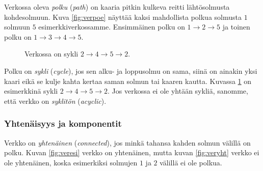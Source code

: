 
Verkossa oleva \emph{polku} (\emph{path}) on kaaria pitkin kulkeva reitti
lähtösolmusta kohdesolmuun.
Kuva \ref{fig:verpoe} näyttää kaksi
mahdollista polkua solmusta $1$ solmuun $5$ esimerkkiverkossamme.
Ensimmäinen polku on $1 \rightarrow 2 \rightarrow 5$
ja toinen polku on $1 \rightarrow 3 \rightarrow 4 \rightarrow 5$.

\begin{figure}
\center
\begin{center}
\end{center}
\caption{Verkossa on sykli $2 \rightarrow 4 \rightarrow 5 \rightarrow 2$.}
\label{fig:versyk}
\end{figure}


Polku on \emph{sykli} (\emph{cycle}), jos sen alku- ja loppusolmu on sama,
siinä on ainakin yksi kaari 
eikä se kulje kahta kertaa saman solmun tai kaaren kautta.
Kuvassa \ref{fig:versyk} on esimerkkinä sykli
$2 \rightarrow 4 \rightarrow 5 \rightarrow 2$.
Jos verkossa ei ole yhtään sykliä, sanomme, että verkko on \emph{syklitön}
(\emph{acyclic}).

\subsubsection{Yhtenäisyys ja komponentit}


Verkko on \emph{yhtenäinen} (\emph{connected}),
jos minkä tahansa kahden solmun välillä on polku.
Kuvan \ref{fig:veresi} verkko on yhtenäinen,
mutta kuvan \ref{fig:veryht} verkko ei ole yhtenäinen,
koska esimerkiksi solmujen $1$ ja $2$ välillä ei ole polkua.

